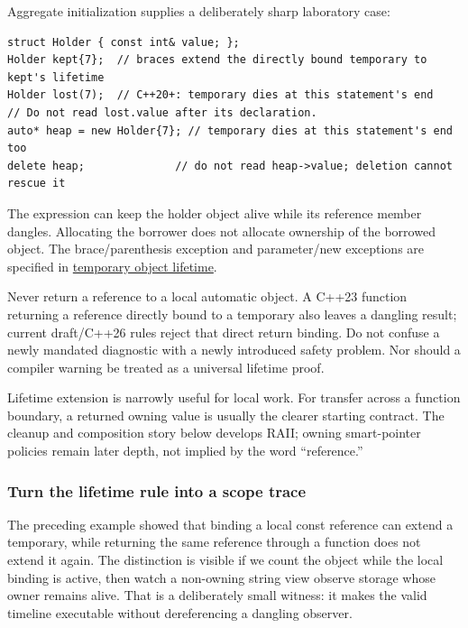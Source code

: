 Aggregate initialization supplies a deliberately sharp laboratory case:

\begin{verbatim}
struct Holder { const int& value; };
Holder kept{7};  // braces extend the directly bound temporary to kept's lifetime
Holder lost(7);  // C++20+: temporary dies at this statement's end
// Do not read lost.value after its declaration.
auto* heap = new Holder{7}; // temporary dies at this statement's end too
delete heap;              // do not read heap->value; deletion cannot rescue it
\end{verbatim}

The  expression can keep the holder object alive while its reference member dangles. Allocating the borrower does not allocate ownership of the borrowed object. The brace/parenthesis exception and parameter/new exceptions are specified in \href{https://eel.is/c++draft/class.temporary}{temporary object lifetime}.

Never return a reference to a local automatic object. A C++23 function returning a reference directly bound to a temporary also leaves a dangling result; current draft/C++26 rules reject that direct return binding. Do not confuse a newly mandated diagnostic with a newly introduced safety problem. Nor should a compiler warning be treated as a universal lifetime proof.

Lifetime extension is narrowly useful for local work. For transfer across a function boundary, a returned owning value is usually the clearer starting contract. The cleanup and composition story below develops RAII; owning smart-pointer policies remain later depth, not implied by the word ``reference.''

\subsubsection{Turn the lifetime rule into a scope trace}\label{01-foundations-i-ch003-turn-the-lifetime-rule-into-a-scope-trace}

\hypertarget{01-foundations-i-ch003-turn-the-lifetime-rule-into-a-scope-trace}{}

The preceding example showed that binding a local const reference can extend a temporary, while returning the same reference through a function does not extend it again. The distinction is visible if we count the object while the local binding is active, then watch a non-owning string view observe storage whose owner remains alive. That is a deliberately small witness: it makes the valid timeline executable without dereferencing a dangling observer.

